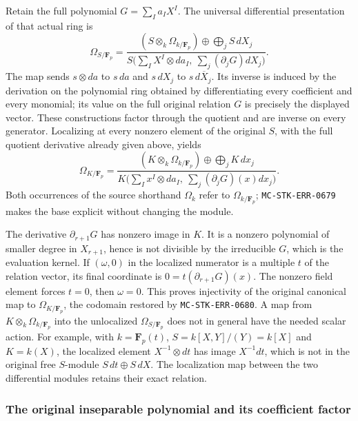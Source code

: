 Retain the full polynomial \(G=\sum_I a_I X^I\). The universal differential presentation of that actual ring is \[
 \Omega_{S/\mathbf F_p}=
 \frac{(S\otimes_k\Omega_{k/\mathbf F_p})\oplus\bigoplus_j S\,dX_j}
 {S\bigl(\sum_I X^I\otimes da_I,\ \sum_j(\partial_jG)dX_j\bigr)}.
\] The map sends \(s\otimes da\) to \(s\,da\) and \(s\,dX_j\) to \(s\,d\overline X_j\). Its inverse is induced by the derivation on the polynomial ring obtained by differentiating every coefficient and every monomial; its value on the full original relation \(G\) is precisely the displayed vector. These constructions factor through the quotient and are inverse on every generator. Localizing at every nonzero element of the original \(S\), with the full quotient derivative already given above, yields \[
 \Omega_{K/\mathbf F_p}=
 \frac{(K\otimes_k\Omega_{k/\mathbf F_p})\oplus\bigoplus_j K\,dx_j}
 {K\bigl(\sum_I x^I\otimes da_I,\ \sum_j(\partial_jG)(x)dx_j\bigr)}.
\] Both occurrences of the source shorthand \(\Omega_k\) refer to \(\Omega_{k/\mathbf F_p}\); \texttt{MC-\AlgebraIdentifierBreak{}STK-\AlgebraIdentifierBreak{}ERR-\AlgebraIdentifierBreak{}0679} makes the base explicit without changing the module.

The derivative \(\partial_{r+1}G\) has nonzero image in \(K\). It is a nonzero polynomial of smaller degree in \(X_{r+1}\), hence is not divisible by the irreducible \(G\), which is the evaluation kernel. If \((\omega,0)\) in the localized numerator is a multiple \(t\) of the relation vector, its final coordinate is \(0=t(\partial_{r+1}G)(x)\). The nonzero field element forces \(t=0\), then \(\omega=0\). This proves injectivity of the original canonical map to \(\Omega_{K/\mathbf F_p}\), the codomain restored by \texttt{MC-\AlgebraIdentifierBreak{}STK-\AlgebraIdentifierBreak{}ERR-\AlgebraIdentifierBreak{}0680}. A map from \(K\otimes_k\Omega_{k/\mathbf F_p}\) into the unlocalized \(\Omega_{S/\mathbf F_p}\) does not in general have the needed scalar action. For example, with \(k=\mathbf F_p(t)\), \(S=k[X,Y]/(Y)=k[X]\) and \(K=k(X)\), the localized element \(X^{-1}\otimes dt\) has image \(X^{-1}dt\), which is not in the original free \(S\)-module \(S\,dt\oplus S\,dX\). The localization map between the two differential modules retains their exact relation.

\subsubsection{The original inseparable polynomial and its coefficient factor}\label{algebra-proof-063-the-original-inseparable-polynomial-and-its-coefficient-factor}

